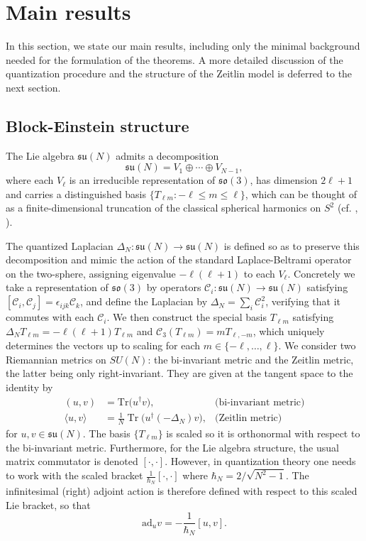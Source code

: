 \documentclass[11pt]{amsart}
\numberwithin{equation}{section}
\theoremstyle{definition}
\newcommand{\ad}{\mathrm{ad}}
\newcommand{\soop}{\mathcal{C}}
\begin{document}
\section{Main results}\label{main_results}

In this section, we state our main results, including only the minimal background needed for the formulation of the theorems. 
A more detailed discussion of the quantization procedure and the structure of the Zeitlin model is deferred to the next section.

\subsection{Block-Einstein structure}

The Lie algebra $\mathfrak{su}(N)$ admits a decomposition
\begin{equation}\label{eq_su_n_main}
\mathfrak{su}(N) = V_1 \oplus \cdots \oplus V_{N-1},
\end{equation}
where each $V_\ell$ is an irreducible representation of $\mathfrak{so}(3)$, has dimension $2\ell + 1$ and carries a distinguished basis 
$\{T_{\ell m} : -\ell \leq m \leq \ell\}$, which can be thought of as a finite-dimensional truncation of the classical spherical harmonics on $S^2$ (cf. \cite{MoVi2024}, \cite{Ze2004}).

The quantized Laplacian $\Delta_N : \mathfrak{su}(N) \rightarrow \mathfrak{su}(N)$ is defined so as to preserve this decomposition and mimic the action of the standard Laplace-Beltrami operator on the two-sphere, assigning eigenvalue $-\ell(\ell+1)$ to each $V_\ell$. Concretely we take a representation of $\mathfrak{so}(3)$ by operators $\soop_i\colon \mathfrak{su}(N)\to\mathfrak{su}(N)$
satisfying $[\soop_i,\soop_j]=\epsilon_{ijk}\soop_k$, and define the Laplacian by $\Delta_N = \sum_i \soop_i^2$, verifying that it commutes with each $\soop_i$. We then construct the special basis $T_{\ell m}$ satisfying $\Delta_N T_{\ell m} = -\ell(\ell+1)T_{\ell m}$ and $\soop_3(T_{\ell m}) = mT_{\ell,-m}$, which uniquely determines the vectors up to scaling for each $m\in \{-\ell,\ldots, \ell\}$. We consider two Riemannian metrics on $SU(N)$: the bi-invariant metric and the Zeitlin metric, the latter being only right-invariant. They are given at the tangent space to the identity by 
\begin{align}
(u, v) &= \mathrm{Tr}\big(u^\dagger v\big), \qquad &\text{(bi-invariant metric)} \label{eq_biinvariant_metric}
\\
\langle u, v\rangle &= \frac{1}{N} \operatorname{Tr}\big(u^\dagger (-\Delta_N) v\big), &\text{(Zeitlin metric)} \label{eq_zeitlin_metric}
\end{align}
for $u, v \in \mathfrak{su}(N)$.
The basis $\{ T_{\ell m} \}$ is scaled so it is orthonormal with respect to the bi-invariant metric.
Furthermore, for the Lie algebra structure, the usual matrix commutator is denoted $[\cdot,\cdot]$.
However, in quantization theory one needs to work with the scaled bracket $\frac{1}{\hbar_N}[\cdot,\cdot]$ where $\hbar_N = 2/\sqrt{N^2-1}$.
The infinitesimal (right) adjoint action is therefore defined with respect to this scaled Lie bracket, so that $$\ad_uv = -\frac{1}{\hbar_N}[u, v].$$
\end{document}
